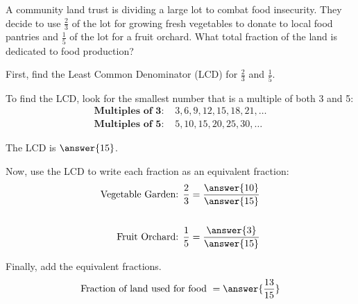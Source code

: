 \documentclass{ximera}
\begin{document}
\begin{problem}
A community land trust is dividing a large lot to combat food insecurity. They decide to use $\textstyle \frac{2}{3}$ of the lot for growing fresh vegetables to donate to local food pantries and $\textstyle \frac{1}{5}$ of the lot for a fruit orchard. What total fraction of the land is dedicated to food production?

First, find the Least Common Denominator (LCD) for $\frac{2}{3}$ and $\frac{1}{5}.$

    \begin{hint}
      To find the LCD, look for the smallest number that is a multiple of both 3 and 5:
      \begin{align*}
          \textbf{Multiples of 3: } & 3, 6, 9, 12, 15, 18, 21, \dots \\
          \textbf{Multiples of 5: } & 5, 10, 15, 20, 25, 30, \dots
      \end{align*}
    \end{hint}

    The LCD is $\answer{15}$.

    Now, use the LCD to write each fraction as an equivalent fraction:
    \begin{align*}
        \text{Vegetable Garden: } \frac{2}{3} &= \frac{\answer{10}}{\answer{15}} \\
                                                & \\
        \text{Fruit Orchard: } \frac{1}{5} &= \frac{\answer{3}}{\answer{15}}
    \end{align*}

    Finally, add the equivalent fractions.
    \[
     \textrm{Fraction of land used for food} \ = \answer{\frac{13}{15}}
    \]

\end{problem}
\end{document}
